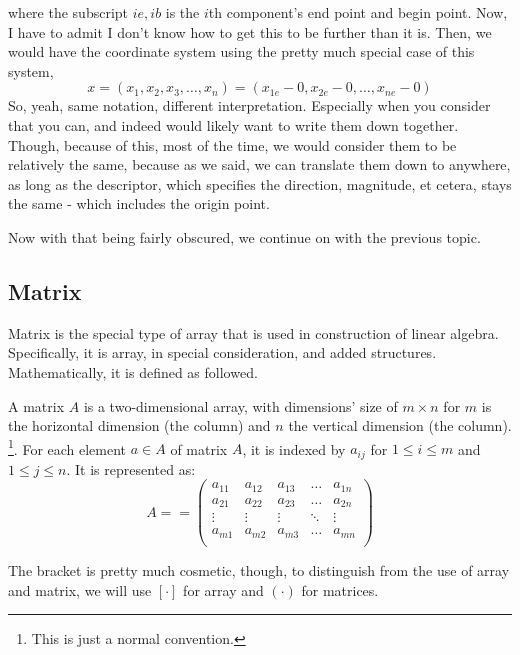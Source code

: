 where the subscript $ie, ib$ is the $i$th component's end point and begin point. Now, I have to admit I don't know how to get this to be further than it is. Then, we would have the coordinate system using the pretty much special case of this system, 
\begin{equation}
    x = (x_{1},x_{2},x_{3},\dots,x_{n}) = (x_{1e}- 0, x_{2e}- 0,\dots, x_{ne}- 0) 
\end{equation}
So, yeah, same notation, different interpretation. Especially when you consider that you can, and indeed would likely want to write them down together. Though, because of this, most of the time, we would consider them to be relatively the same, because as we said, we can translate them down to anywhere, as long as the descriptor, which specifies the direction, magnitude, et cetera, stays the same - which includes the origin point. 

Now with that being fairly obscured, we continue on with the previous topic. 
\subsection{Matrix}

Matrix is the special type of array that is used in construction of linear algebra. Specifically, it is array, in special consideration, and added structures. Mathematically, it is defined as followed. 
\begin{definition}[Matrix]
    A matrix $A$ is a two-dimensional array, with dimensions' size of $m\times n$ for $m$ is the horizontal dimension (the column) and $n$ the vertical dimension (the column). \footnote{This is just a normal convention.}. For each element $a\in A$ of matrix $A$, it is indexed by $a_{ij}$ for $1\leq i \leq m$ and $1\leq j \leq n$. It is represented as: 
    \begin{equation}
        A =  = \begin{pmatrix}
            a_{11} & a_{12} & a_{13} & \dots & a_{1n}\\
            a_{21} & a_{22} & a_{23} & \dots & a_{2n}\\
            \vdots & \vdots & \vdots & \ddots & \vdots \\
            a_{m1} & a_{m2} & a_{m3} & \dots & a_{mn}\\
        \end{pmatrix}
    \end{equation}
\end{definition}

The bracket is pretty much cosmetic, though, to distinguish from the use of array and matrix, we will use $[\cdot]$ for array and $(\cdot)$ for matrices. 